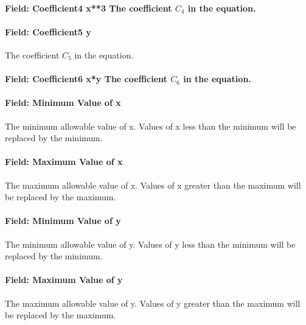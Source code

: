 \paragraph{Field: Coefficient4 x**3 The coefficient \(C_4\) in the equation.}\label{field-coefficient4-x3-the-coefficient-cux5f4-in-the-equation.}

\paragraph{Field: Coefficient5 y}\label{field-coefficient5-y}

The coefficient \(C_5\) in the equation.

\paragraph{Field: Coefficient6 x*y The coefficient \(C_6\) in the equation.}\label{field-coefficient6-xy-the-coefficient-cux5f6-in-the-equation.}

\paragraph{Field: Minimum Value of x}\label{field-minimum-value-of-x-8}

The minimum allowable value of x. Values of x less than the minimum will be replaced by the minimum.

\paragraph{Field: Maximum Value of x}\label{field-maximum-value-of-x-9}

The maximum allowable value of x. Values of x greater than the maximum will be replaced by the maximum.

\paragraph{Field: Minimum Value of y}\label{field-minimum-value-of-y-3}

The minimum allowable value of y. Values of y less than the minimum will be replaced by the minimum.

\paragraph{Field: Maximum Value of y}\label{field-maximum-value-of-y-3}

The maximum allowable value of y. Values of y greater than the maximum will be replaced by the maximum.

